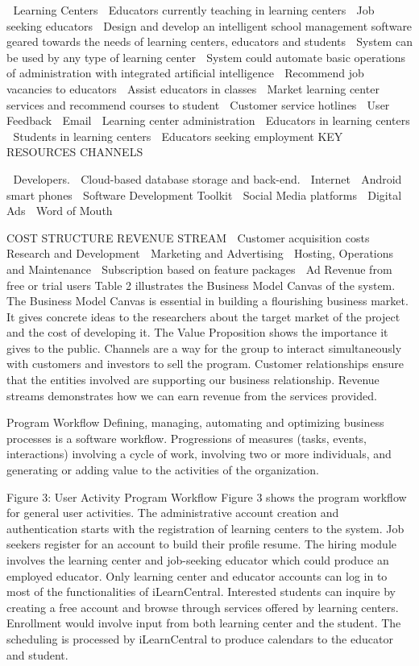 	Learning Centers
	Educators currently teaching in learning centers
	Job seeking educators		Design and develop an intelligent school management software geared towards the needs of learning centers, educators and students		System can be used by any type of learning center 
	System could automate basic operations of administration with integrated artificial intelligence
	Recommend job vacancies to educators
	Assist educators in classes
	Market learning center services and recommend courses to student
		Customer service hotlines 
	User Feedback
	Email		Learning center administration 
	Educators in learning centers 
	Students in learning centers
	Educators seeking employment
	KEY RESOURCES
		CHANNELS
	
		Developers.
	Cloud-based database storage and back-end.
	Internet
	Android smart phones
	Software Development Toolkit			Social Media platforms
	Digital Ads
	Word of Mouth
	
    COST STRUCTURE	    REVENUE STREAM
	Customer acquisition costs 
	Research and Development 
	Marketing and Advertising
	Hosting, Operations and Maintenance		Subscription based on feature packages 
	Ad Revenue from free or trial users
Table 2 illustrates the Business Model Canvas of the system. The Business Model Canvas is essential in building a flourishing business market. It gives concrete ideas to the researchers about the target market of the project and the cost of developing it. The Value Proposition shows the importance it gives to the public. Channels are a way for the group to interact simultaneously with customers and investors to sell the program. Customer relationships ensure that the entities involved are supporting our business relationship. Revenue streams demonstrates how we can earn revenue from the services provided.

Program Workflow
Defining, managing, automating and optimizing business processes is a software workflow. Progressions of measures (tasks, events, interactions) involving a cycle of work, involving two or more individuals, and generating or adding value to the activities of the organization.
 
Figure 3: User Activity Program Workflow
Figure 3 shows the program workflow for general user activities. The administrative account creation and authentication starts with the registration of learning centers to the system. Job seekers register for an account to build their profile resume. The hiring module involves the learning center and job-seeking educator which could produce an employed educator. Only learning center and educator accounts can log in to most of the functionalities of iLearnCentral. Interested students can inquire by creating a free account and browse through services offered by learning centers. Enrollment would involve input from both learning center and the student. The scheduling is processed by iLearnCentral to produce calendars to the educator and student.
 
